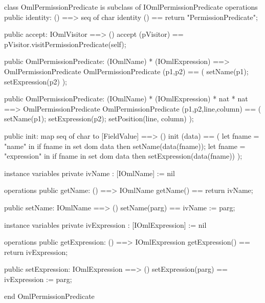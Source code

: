 \begin{vdm_al}
class OmlPermissionPredicate is subclass of IOmlPermissionPredicate
operations
  public identity: () ==> seq of char
  identity () == return "PermissionPredicate";

  public accept: IOmlVisitor ==> ()
  accept (pVisitor) == pVisitor.visitPermissionPredicate(self);

  public OmlPermissionPredicate:
    (IOmlName) *
    (IOmlExpression) ==> OmlPermissionPredicate
  OmlPermissionPredicate (p1,p2) == 
    ( setName(p1);
      setExpression(p2) );

  public OmlPermissionPredicate:
    (IOmlName) *
    (IOmlExpression) *
    nat *
    nat ==> OmlPermissionPredicate
  OmlPermissionPredicate (p1,p2,line,column) == 
    ( setName(p1);
      setExpression(p2);
      setPosition(line, column) );

  public init: map seq of char to [FieldValue] ==> ()
  init (data) ==
    ( let fname = "name" in
        if fname in set dom data
        then setName(data(fname));
      let fname = "expression" in
        if fname in set dom data
        then setExpression(data(fname)) );

instance variables
  private ivName : [IOmlName] := nil

operations
  public getName: () ==> IOmlName
  getName() == return ivName;

  public setName: IOmlName ==> ()
  setName(parg) == ivName := parg;

instance variables
  private ivExpression : [IOmlExpression] := nil

operations
  public getExpression: () ==> IOmlExpression
  getExpression() == return ivExpression;

  public setExpression: IOmlExpression ==> ()
  setExpression(parg) == ivExpression := parg;

end OmlPermissionPredicate
\end{vdm_al}

